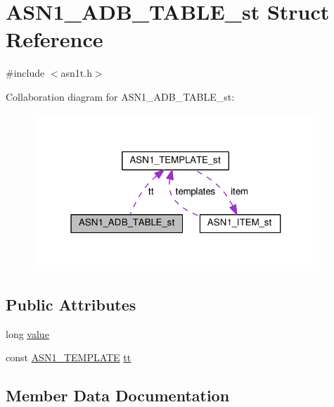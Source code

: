 \hypertarget{struct_a_s_n1___a_d_b___t_a_b_l_e__st}{}\section{A\+S\+N1\+\_\+\+A\+D\+B\+\_\+\+T\+A\+B\+L\+E\+\_\+st Struct Reference}
\label{struct_a_s_n1___a_d_b___t_a_b_l_e__st}


{\ttfamily \#include $<$asn1t.\+h$>$}



Collaboration diagram for A\+S\+N1\+\_\+\+A\+D\+B\+\_\+\+T\+A\+B\+L\+E\+\_\+st\+:
\nopagebreak
\begin{figure}[H]
\begin{center}
\leavevmode
\includegraphics[width=304pt]{struct_a_s_n1___a_d_b___t_a_b_l_e__st__coll__graph}
\end{center}
\end{figure}
\subsection*{Public Attributes}
\begin{DoxyCompactItemize}
\item 
long \hyperlink{struct_a_s_n1___a_d_b___t_a_b_l_e__st_a629d5818b02f9fb52b74bad469e1e5b0}{value}
\item 
const \hyperlink{asn1_8h_a6c952ee1ae445fda1ca8e1761bbd93ac}{A\+S\+N1\+\_\+\+T\+E\+M\+P\+L\+A\+TE} \hyperlink{struct_a_s_n1___a_d_b___t_a_b_l_e__st_ae2a3f9d776e8c11c09d8b9879c63fac2}{tt}
\end{DoxyCompactItemize}


\subsection{Member Data Documentation}
